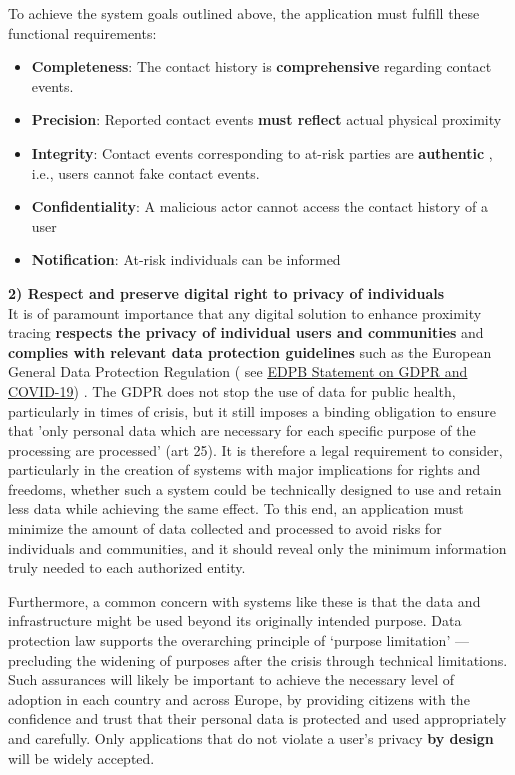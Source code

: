 \documentclass[10.8pt,a4paper]{article}
\begin{document}
To achieve the system goals outlined above, the application must fulfill these functional
requirements:
\begin{itemize}\itemsep0pt
\item \textbf{Completeness}:  The contact history is \textbf{comprehensive}  regarding contact events.
\item \textbf{Precision}:  Reported contact events \textbf{must reflect}  actual physical proximity
\item \textbf{Integrity}: Contact events corresponding to at-risk parties are \textbf{authentic} , i.e., users cannot fake contact events.
\item \textbf{Confidentiality}:  A malicious actor cannot access the contact history of a user
\item \textbf{Notification}:  At-risk individuals can be informed
\end{itemize}
\textbf{2) Respect and preserve digital right to privacy of individuals}\\
It is of paramount importance that any digital solution to enhance proximity tracing \textbf{respects the privacy of individual users and communities} and \textbf{complies with relevant data protection guidelines} such as the European General Data Protection Regulation ( see \href{http://edpb.europa.eu}{\underline{EDPB Statement on GDPR and COVID-19}}) . The GDPR does not stop the use of data for public health, particularly in times of crisis, but it still imposes a binding obligation to ensure that 'only personal data which are necessary for each specific purpose of the processing are processed' (art 25). It is therefore a legal requirement to consider, particularly in the creation of systems with major implications for rights and freedoms, whether such a system could be technically designed to use and retain less data while achieving the same effect. To this end, an application must minimize the amount of data collected and processed to avoid risks for individuals and communities, and it should reveal only the minimum information truly needed to each authorized entity.

Furthermore, a common concern with systems like these is that the data and infrastructure
might be used beyond its originally intended purpose. Data protection law supports the
overarching principle of ‘purpose limitation’ — precluding the widening of purposes after the crisis through technical limitations. Such assurances will likely be important to achieve the necessary level of adoption in each country and across Europe, by providing citizens with the confidence and trust that their personal data is protected and used appropriately and carefully. Only applications that do not violate a user’s privacy \textbf{by design} will be widely accepted.
\end{document}

